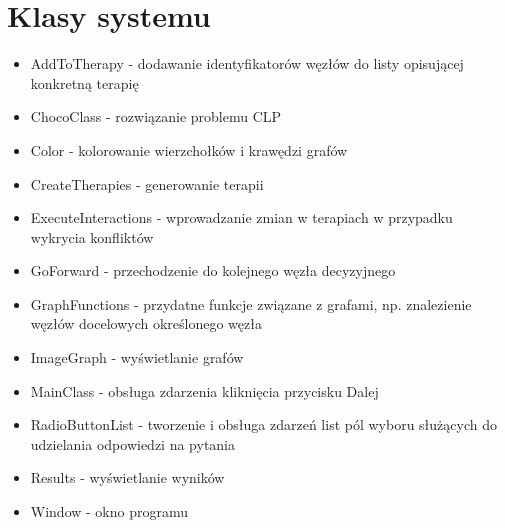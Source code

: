 \section{Klasy systemu}
\begin{itemize}
\item{AddToTherapy - dodawanie identyfikatorów węzłów do listy opisującej konkretną terapię}
\item{ChocoClass - rozwiązanie problemu CLP}
\item{Color - kolorowanie wierzchołków i krawędzi grafów}
\item{CreateTherapies - generowanie terapii}
\item{ExecuteInteractions - wprowadzanie zmian w terapiach w przypadku wykrycia konfliktów}
\item{GoForward - przechodzenie do kolejnego węzła decyzyjnego}
\item{GraphFunctions - przydatne funkcje związane z grafami, np. znalezienie węzłów docelowych określonego węzła}
\item{ImageGraph - wyświetlanie grafów}
\item{MainClass - obsługa zdarzenia kliknięcia przycisku Dalej}
\item{RadioButtonList - tworzenie i obsługa zdarzeń list pól wyboru służących do udzielania odpowiedzi na pytania}
\item{Results - wyświetlanie wyników}
\item{Window - okno programu}
\end{itemize}

